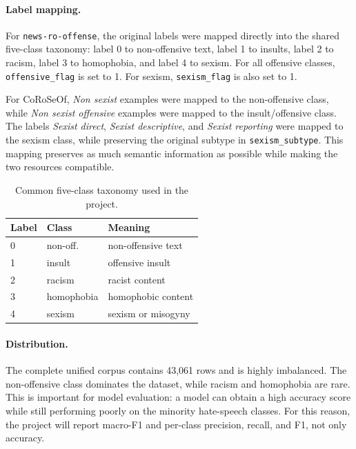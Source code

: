 \paragraph{Label mapping.}
For \texttt{news-ro-offense}, the original labels were mapped directly into the shared five-class taxonomy: label 0 to non-offensive text, label 1 to insults, label 2 to racism, label 3 to homophobia, and label 4 to sexism. For all offensive classes, \texttt{offensive\_flag} is set to 1. For sexism, \texttt{sexism\_flag} is also set to 1.

For CoRoSeOf, \textit{Non sexist} examples were mapped to the non-offensive class, while \textit{Non sexist offensive} examples were mapped to the insult/offensive class. The labels \textit{Sexist direct}, \textit{Sexist descriptive}, and \textit{Sexist reporting} were mapped to the sexism class, while preserving the original subtype in \texttt{sexism\_subtype}. This mapping preserves as much semantic information as possible while making the two resources compatible.

\begin{table}[H]
\centering
\small
\begin{tabular}{lll}
\toprule
Label & Class & Meaning \\
\midrule
0 & non-off. & non-offensive text \\
1 & insult & offensive insult \\
2 & racism & racist content \\
3 & homophobia & homophobic content \\
4 & sexism & sexism or misogyny \\
\bottomrule
\end{tabular}
\caption{Common five-class taxonomy used in the project.}
\label{tab:label_taxonomy}
\end{table}

\paragraph{Distribution.}
The complete unified corpus contains 43,061 rows and is highly imbalanced. The non-offensive class dominates the dataset, while racism and homophobia are rare. This is important for model evaluation: a model can obtain a high accuracy score while still performing poorly on the minority hate-speech classes. For this reason, the project will report macro-F1 and per-class precision, recall, and F1, not only accuracy.

